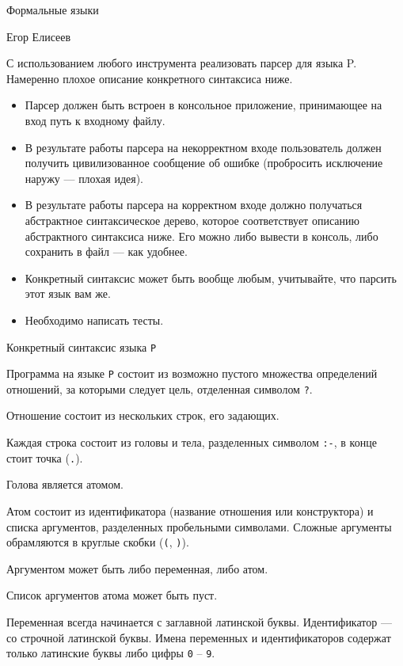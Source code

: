 \documentclass[12pt]{article}
\begin{document}
\begin{center}
{\LARGE Формальные языки}

\bigskip

{\Large Егор Елисеев}
\end{center}

\bigskip

С использованием любого инструмента реализовать парсер для языка P. Намеренно плохое описание конкретного синтаксиса ниже.

\begin{itemize}
  \item Парсер должен быть встроен в консольное приложение, принимающее на вход путь к входному файлу.
  \item В результате работы парсера на некорректном входе пользователь должен получить цивилизованное сообщение об ошибке (пробросить исключение наружу --- плохая идея).
  \item В результате работы парсера на корректном входе должно получаться абстрактное синтаксическое дерево, которое соответствует описанию абстрактного синтаксиса ниже. Его можно либо вывести в консоль, либо сохранить в файл --- как удобнее.
  \item Конкретный синтаксис может быть вообще любым, учитывайте, что парсить этот язык вам же.
  \item Необходимо написать тесты.
\end{itemize}


\begin{center}
    \Large{Конкретный синтаксис языка \verb!P!}
\end{center}

Программа на языке \verb!P! состоит из возможно пустого множества определений отношений, за которыми следует цель, отделенная символом \verb!?!.

Отношение состоит из нескольких строк, его задающих.

Каждая строка состоит из головы и тела, разделенных символом \verb!:-!, в конце стоит точка (\verb!.!).

Голова является атомом.

Атом состоит из идентификатора (название отношения или конструктора) и списка аргументов, разделенных пробельными символами. Сложные аргументы обрамляются в круглые скобки (\verb!(!, \verb!)!).

Аргументом может быть либо переменная, либо атом.

Список аргументов атома может быть пуст.

Переменная всегда начинается с заглавной латинской буквы. Идентификатор --- со строчной латинской буквы.
Имена переменных и идентификаторов содержат только латинские буквы либо цифры \verb!0! -- \verb!9!.
\end{document}
